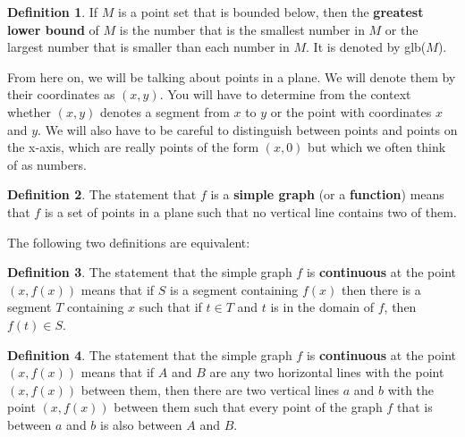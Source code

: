 \documentclass{article}
\theoremstyle{definition}
\newtheorem{definition}{Definition}
\begin{document}
\begin{definition}
If $M$ is a point set that is bounded below, then the \textbf{greatest lower bound} of $M$ is the number that is the smallest number in $M$ or the largest number that is smaller than each number in $M$. It is denoted by glb($M$).
\end{definition}

From here on, we will be talking about points in a plane. We will denote them by their coordinates as $(x, y)$. You will have to determine from the context whether $(x, y)$ denotes a segment from $x$ to $y$ or the point with coordinates $x$ and $y$. We will also have to be careful to distinguish between points and points on the x-axis, which are really points of the form $(x, 0)$ but which we often think of as numbers.

\begin{definition}
The statement that $f$ is a \textbf{simple graph} (or a \textbf{function}) means that $f$ is a set of points in a plane such that no vertical line contains two of them.
\end{definition}

The following two definitions are equivalent:

\begin{definition}
The statement that the simple graph $f$ is \textbf{continuous} at the point $(x, f(x))$ means that if $S$ is a segment containing $f(x)$ then there is a segment $T$ containing $x$ such that if $t \in T$ and $t$ is in the domain of $f$, then $f(t) \in S$.
\end{definition}

\begin{definition}
The statement that the simple graph $f$ is \textbf{continuous} at the point $(x, f(x))$ means that if $A$ and $B$ are any two horizontal lines with the point $(x, f(x))$ between them, then there are two vertical lines $a$ and $b$ with the point $(x, f(x))$ between them such that every point of the graph $f$ that is between $a$ and $b$ is also between $A$ and $B$.
\end{definition}
\end{document}
